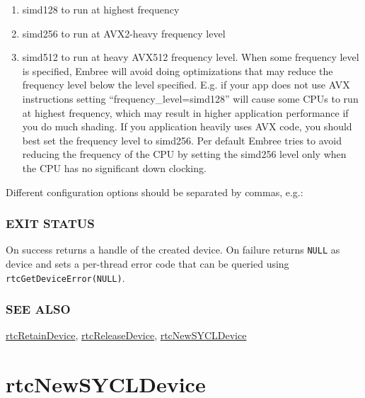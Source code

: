 \begin{itemize}
  \begin{enumerate}
  \def\labelenumi{\alph{enumi})}
  \tightlist
  \item
    simd128 to run at highest frequency
  \item
    simd256 to run at AVX2-heavy frequency level
  \item
    simd512 to run at heavy AVX512 frequency level. When some frequency
    level is specified, Embree will avoid doing optimizations that may
    reduce the frequency level below the level specified. E.g. if your
    app does not use AVX instructions setting
    ``frequency\_level=simd128'' will cause some CPUs to run at highest
    frequency, which may result in higher application performance if you
    do much shading. If you application heavily uses AVX code, you
    should best set the frequency level to simd256. Per default Embree
    tries to avoid reducing the frequency of the CPU by setting the
    simd256 level only when the CPU has no significant down clocking.
  \end{enumerate}
\end{itemize}

Different configuration options should be separated by commas, e.g.:

\begin{Shaded}
\begin{Highlighting}[]
\OperatorTok{(}\OperatorTok{);}
\end{Highlighting}
\end{Shaded}

\subsubsection{EXIT STATUS}\label{exit-status}

On success returns a handle of the created device. On failure returns
\texttt{NULL} as device and sets a per-thread error code that can be
queried using \texttt{rtcGetDeviceError(NULL)}.

\subsubsection{SEE ALSO}\label{see-also}

\hyperref[rtcretaindevice]{rtcRetainDevice},
\hyperref[rtcreleasedevice]{rtcReleaseDevice},
\hyperref[rtcnewsycldevice]{rtcNewSYCLDevice}

\pagebreak

\section{rtcNewSYCLDevice}\label{rtcnewsycldevice}


